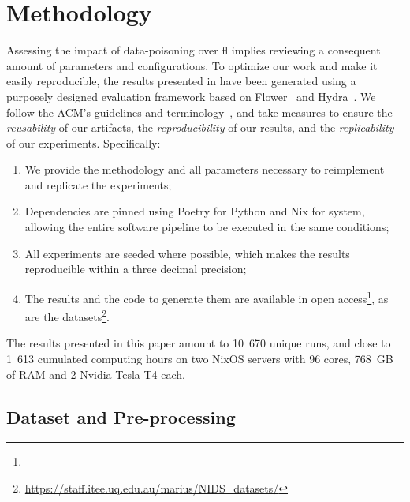 \section{Methodology\label{sec:assess.method}}

Assessing the impact of data-poisoning over \gls{fl} implies reviewing a consequent amount of parameters and configurations.
To optimize our work and make it easily reproducible, the results presented in  have been generated using a purposely designed evaluation framework based on Flower~\cite{beutel_Flowerfriendlyfederated_2020} and Hydra~\cite{Hydra}.
We follow the ACM's guidelines and terminology~\cite{ACM_artifacts}, and take measures to ensure the \emph{reusability} of our artifacts, the \emph{reproducibility} of our results, and the \emph{replicability} of our experiments.
Specifically:
\begin{enumerate}[1.]
    \item We provide the methodology and all parameters necessary to reimplement and replicate the experiments;
    \item Dependencies are pinned using Poetry for Python and Nix for system, allowing the entire software pipeline to be executed in the same conditions;
    \item All experiments are seeded where possible, which makes the results reproducible within a three decimal precision;
    \item The results and the code to generate them are available in open access\footnote{\codeurl}, as are the datasets\footnote{\url{https://staff.itee.uq.edu.au/marius/NIDS_datasets/}}.
\end{enumerate}

The results presented in this paper amount to 10~670 unique runs, and close to 1~613 cumulated computing hours on two NixOS servers with 96 cores, 768~GB of RAM and 2 Nvidia Tesla T4 each. 



\subsection{Dataset and Pre-processing\label{sec:assess.method.dataset}}

